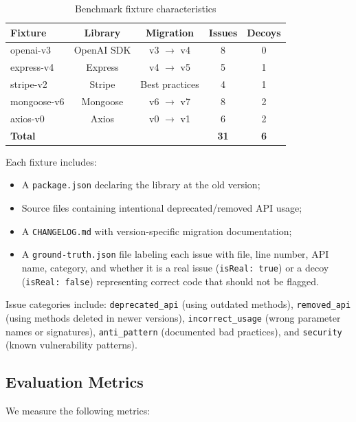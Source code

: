 \documentclass[sigconf,nonacm]{acmart}
\begin{document}
\begin{table}[h]
\centering
\caption{Benchmark fixture characteristics}
\label{tab:fixtures}
\begin{tabular}{lcccc}
\hline
\textbf{Fixture} & \textbf{Library} & \textbf{Migration} & \textbf{Issues} & \textbf{Decoys} \\
\hline
openai-v3 & OpenAI SDK & v3 $\rightarrow$ v4 & 8 & 0 \\
express-v4 & Express & v4 $\rightarrow$ v5 & 5 & 1 \\
stripe-v2 & Stripe & Best practices & 4 & 1 \\
mongoose-v6 & Mongoose & v6 $\rightarrow$ v7 & 8 & 2 \\
axios-v0 & Axios & v0 $\rightarrow$ v1 & 6 & 2 \\
\hline
\textbf{Total} & & & \textbf{31} & \textbf{6} \\
\hline
\end{tabular}
\end{table}

Each fixture includes:
\begin{itemize}
    \item A \texttt{package.json} declaring the library at the old version;
    \item Source files containing intentional deprecated/removed API usage;
    \item A \texttt{CHANGELOG.md} with version-specific migration documentation;
    \item A \texttt{ground-truth.json} file labeling each issue with file, line number, API name, category, and whether it is a real issue (\texttt{isReal: true}) or a decoy (\texttt{isReal: false}) representing correct code that should not be flagged.
\end{itemize}

Issue categories include: \texttt{deprecated\_api} (using outdated methods), \texttt{removed\_api} (using methods deleted in newer versions), \texttt{incorrect\_usage} (wrong parameter names or signatures), \texttt{anti\_pattern} (documented bad practices), and \texttt{security} (known vulnerability patterns).

\subsection{Evaluation Metrics}

We measure the following metrics:
\end{document}
